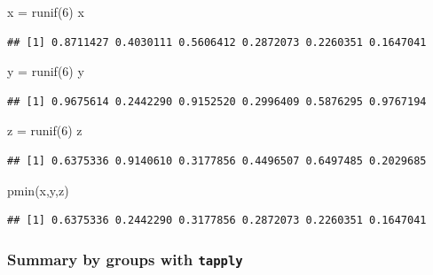 \documentclass[
]{book}
\newenvironment{Shaded}{\begin{snugshade}}{\end{snugshade}}
\newcommand{\DecValTok}[1]{\textcolor[rgb]{0.00,0.00,0.81}{#1}}
\newcommand{\FunctionTok}[1]{\textcolor[rgb]{0.00,0.00,0.00}{#1}}
\newcommand{\NormalTok}[1]{#1}
\newcommand{\OtherTok}[1]{\textcolor[rgb]{0.56,0.35,0.01}{#1}}
\begin{document}
\begin{Shaded}
\begin{Highlighting}[]
\NormalTok{x }\OtherTok{=} \FunctionTok{runif}\NormalTok{(}\DecValTok{6}\NormalTok{)}
\NormalTok{x}
\end{Highlighting}
\end{Shaded}

\begin{verbatim}
## [1] 0.8711427 0.4030111 0.5606412 0.2872073 0.2260351 0.1647041
\end{verbatim}

\begin{Shaded}
\begin{Highlighting}[]
\NormalTok{y }\OtherTok{=} \FunctionTok{runif}\NormalTok{(}\DecValTok{6}\NormalTok{)}
\NormalTok{y}
\end{Highlighting}
\end{Shaded}

\begin{verbatim}
## [1] 0.9675614 0.2442290 0.9152520 0.2996409 0.5876295 0.9767194
\end{verbatim}

\begin{Shaded}
\begin{Highlighting}[]
\NormalTok{z }\OtherTok{=} \FunctionTok{runif}\NormalTok{(}\DecValTok{6}\NormalTok{)}
\NormalTok{z}
\end{Highlighting}
\end{Shaded}

\begin{verbatim}
## [1] 0.6375336 0.9140610 0.3177856 0.4496507 0.6497485 0.2029685
\end{verbatim}

\begin{Shaded}
\begin{Highlighting}[]
\FunctionTok{pmin}\NormalTok{(x,y,z)}
\end{Highlighting}
\end{Shaded}

\begin{verbatim}
## [1] 0.6375336 0.2442290 0.3177856 0.2872073 0.2260351 0.1647041
\end{verbatim}

\hypertarget{summary-by-groups-with-tapply}{%
\subsubsection{\texorpdfstring{Summary by groups with \texttt{tapply}}{Summary by groups with tapply}}\label{summary-by-groups-with-tapply}}
\end{document}
